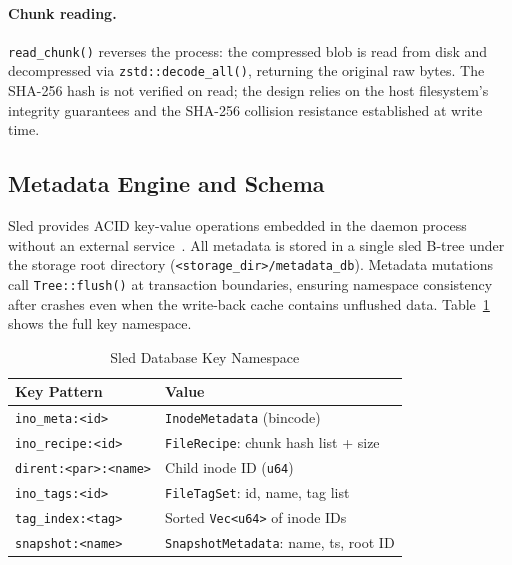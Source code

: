\documentclass[journal]{IEEEtran}
\begin{document}
\paragraph{Chunk reading.}
\texttt{read\_chunk()} reverses the process: the compressed blob is
read from disk and decompressed via \texttt{zstd::decode\_all()},
returning the original raw bytes.  The SHA-256 hash is not verified
on read; the design relies on the host filesystem's integrity guarantees
and the SHA-256 collision resistance established at write time.

\subsection{Metadata Engine and Schema}

Sled provides ACID key-value operations embedded in the daemon process
without an external service~\cite{sled2024}.  All metadata is stored
in a single sled B-tree under the storage root directory
(\texttt{<storage\_dir>/metadata\_db}).  Metadata mutations call
\texttt{Tree::flush()} at transaction boundaries, ensuring namespace
consistency after crashes even when the write-back cache contains
unflushed data.  Table~\ref{tab:schema} shows the full key namespace.

\begin{table}[t]
\caption{Sled Database Key Namespace}
\label{tab:schema}
\centering
\renewcommand{\arraystretch}{1.2}
\footnotesize
\begin{tabular}{p{4.2cm}p{3.6cm}}
\toprule
\textbf{Key Pattern} & \textbf{Value} \\
\midrule
\texttt{ino\_meta:\textless{}id\textgreater{}} &
  \texttt{InodeMetadata} (bincode) \\
\texttt{ino\_recipe:\textless{}id\textgreater{}} &
  \texttt{FileRecipe}: chunk hash list + size \\
\texttt{dirent:\textless{}par\textgreater{}:\textless{}name\textgreater{}} &
  Child inode ID (\texttt{u64}) \\
\texttt{ino\_tags:\textless{}id\textgreater{}} &
  \texttt{FileTagSet}: id, name, tag list \\
\texttt{tag\_index:\textless{}tag\textgreater{}} &
  Sorted \texttt{Vec\textless{}u64\textgreater{}} of inode IDs \\
\texttt{snapshot:\textless{}name\textgreater{}} &
  \texttt{SnapshotMetadata}: name, ts, root ID \\
\bottomrule
\end{tabular}
\end{table}
\end{document}
